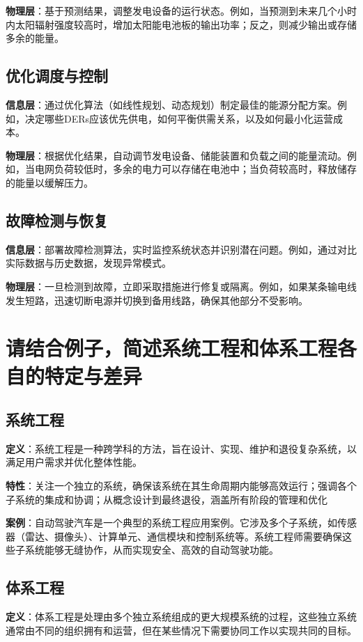\documentclass[UTF8,a4paper]{ctexart}
\begin{document}
	\textbf{物理层}：基于预测结果，调整发电设备的运行状态。例如，当预测到未来几个小时内太阳辐射强度较高时，增加太阳能电池板的输出功率；反之，则减少输出或存储多余的能量。
	
	\subsection{优化调度与控制}
	\textbf{信息层}：通过优化算法（如线性规划、动态规划）制定最佳的能源分配方案。例如，决定哪些DERs应该优先供电，如何平衡供需关系，以及如何最小化运营成本。

	\textbf{物理层}：根据优化结果，自动调节发电设备、储能装置和负载之间的能量流动。例如，当电网负荷较低时，多余的电力可以存储在电池中；当负荷较高时，释放储存的能量以缓解压力。
	
	\subsection{故障检测与恢复}
	\textbf{信息层}：部署故障检测算法，实时监控系统状态并识别潜在问题。例如，通过对比实际数据与历史数据，发现异常模式。
	
	\textbf{物理层}：一旦检测到故障，立即采取措施进行修复或隔离。例如，如果某条输电线发生短路，迅速切断电源并切换到备用线路，确保其他部分不受影响。
	
	
    \newpage


    \section{请结合例子，简述系统工程和体系工程各自的特定与差异}
	
	\subsection{系统工程}
	\textbf{定义}：系统工程是一种跨学科的方法，旨在设计、实现、维护和退役复杂系统，以满足用户需求并优化整体性能。
	
	\textbf{特性}：关注一个独立的系统，确保该系统在其生命周期内能够高效运行；强调各个子系统的集成和协调；从概念设计到最终退役，涵盖所有阶段的管理和优化
	
    \textbf{案例}：自动驾驶汽车是一个典型的系统工程应用案例。它涉及多个子系统，如传感器（雷达、摄像头）、计算单元、通信模块和控制系统等。系统工程师需要确保这些子系统能够无缝协作，从而实现安全、高效的自动驾驶功能。
		
	\subsection{体系工程}
	\textbf{定义}：体系工程是处理由多个独立系统组成的更大规模系统的过程，这些独立系统通常由不同的组织拥有和运营，但在某些情况下需要协同工作以实现共同的目标。
	
\end{document}
